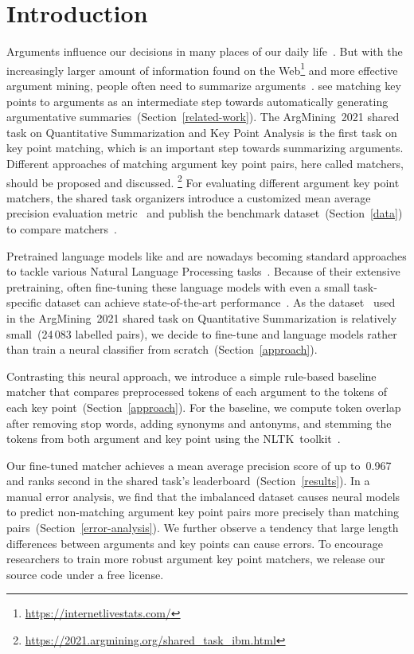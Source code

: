 \section{Introduction}\label{introduction}

Arguments influence our decisions in many places of our daily life~\cite{Bar-HaimEFKLS2020}.
But with the increasingly larger amount of information found on the Web\footnote{\url{https://internetlivestats.com/}} 
and more effective argument mining, people often need to summarize arguments~\cite{LawrenceR2019,Bar-HaimEFKLS2020}.
\citet{Bar-HaimEFKLS2020} see matching key points to arguments as an intermediate step towards automatically generating 
argumentative summaries~(Section~\ref{related-work}).
The ArgMining~2021 shared task on Quantitative Summarization and Key Point Analysis is the first task on key point matching, 
which is an important step towards summarizing arguments.
Different approaches of matching argument key point pairs, here called matchers, should be proposed and discussed.%
\footnote{\url{https://2021.argmining.org/shared_task_ibm.html}}
For evaluating different argument key point matchers, the shared task organizers introduce a customized mean average 
precision evaluation metric~\cite{kpa-2021-overview} and publish the \ArgKP benchmark dataset~(Section~\ref{data}) to compare 
matchers~\cite{Bar-HaimEFKLS2020}. %

Pretrained language models like \Bert and \Roberta are nowadays becoming standard approaches to tackle various Natural 
Language Processing tasks~\cite{DevlinCLT2019,LiuOGDJCLLZS2019}.
Because of their extensive pretraining, often fine-tuning these language models with even a small task-specific dataset 
can achieve state-of-the-art performance~\cite{DevlinCLT2019}.
As the \ArgKP dataset~\cite{Bar-HaimEFKLS2020} used in the ArgMining~2021 shared task on Quantitative Summarization is 
relatively small~(24\,083 labelled pairs), we decide to fine-tune \Bert and \Roberta language models rather than train 
a neural classifier from scratch~(Section~\ref{approach}).

Contrasting this neural approach, we introduce a simple rule-based baseline matcher that compares preprocessed tokens of 
each argument to the tokens of each key point~(Section~\ref{approach}).
For the baseline, we compute token overlap after removing stop words, adding synonyms and antonyms, and stemming the 
tokens from both argument and key point using the NLTK~toolkit~\cite{BirdL2004}.

Our fine-tuned \RobertaBase matcher achieves a mean average precision score of up to~0.967 and ranks second in the 
shared task's leaderboard~(Section~\ref{results}).
In a manual error analysis, we find that the imbalanced \ArgKP dataset causes neural models to predict non-matching 
argument key point pairs more precisely than matching pairs~(Section~\ref{error-analysis}).
We further observe a tendency that large length differences between arguments and key points can cause errors.
To encourage researchers to train more robust argument key point matchers, we release our source code under a free license.%

